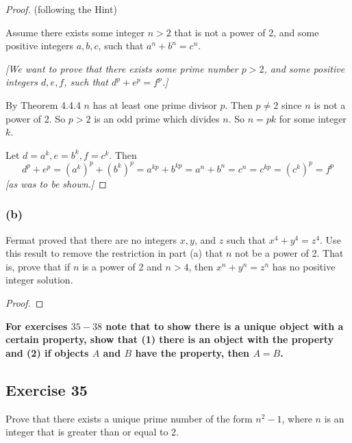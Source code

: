 \documentclass[14pt]{extarticle}
\newcommand{\cy}{\color{cyan}}
\begin{document}
\begin{proof}
(following the Hint)

Assume there exists some integer $n > 2$ that is not a power of 2, and some positive integers $a,b,c$, such that $a^n + b^n = c^n$.

{\it [We want to prove that there exists some prime number $p > 2$, and some positive integers $d,e,f$, such that $d^p + e^p = f^p$.]}

By Theorem 4.4.4 $n$ has at least one prime divisor $p$. Then $p \neq 2$ since $n$ is not a power of 2. So $p > 2$ is an odd prime which divides $n$. So $n = pk$ for some integer $k$.

Let $d = a^k, e = b^k, f = c^k$. Then
\[
d^p + e^p = (a^k)^p + (b^k)^p = a^{kp} + b^{kp} = a^n + b^n = c^n = c^{kp} = (c^k)^p = f^p
\]
{\it [as was to be shown.]}
\end{proof}

\subsubsection{(b)}
Fermat proved that there are no integers $x, y$, and $z$ such that $x^4 + y^4 = z^4$. Use this result to remove the restriction in part (a) that $n$ not be a power of 2. That is, prove that if $n$ is a power of 2 and $n > 4$, then $x^n + y^n = z^n$ has no positive integer solution.

\begin{proof}

\end{proof}

{\bf \cy For exercises $35-38$ note that to show there is a unique object with a certain property, show that (1) there is an object with the property and (2) if objects $A$ and $B$ have the property, then $A = B$.}

\subsection{Exercise 35}
Prove that there exists a unique prime number of the form $n^2 - 1$, where $n$ is an integer that is greater than or equal to 2.
\end{document}
